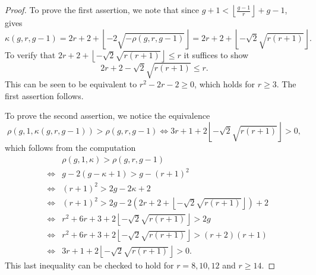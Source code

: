 \documentclass[11pt]{amsart}
\newcommand{\floor}[1]{\left\lfloor #1 \right\rfloor}
\newtheorem{lemma}[theorem]{Lemma}
\theoremstyle{definition}
\theoremstyle{definition}
\begin{document}
\begin{proof}
	To prove the first assertion, we note that since $g+1 < \floor{\frac{g-1}{r}}+g-1$, \cite[Proposition~2.5]{AHL} gives
	 \[\kappa(g,r,g-1)=2r+2+\floor{-2\sqrt{-\rho(g,r,g-1)}}=2r+2 +\floor{-\sqrt{2}\sqrt{r(r+1)}}.\] 
	To verify that $2r+2 +\floor{-\sqrt{2}\sqrt{r(r+1)}}\leq r$ it suffices to show \[2r+2-\sqrt{2}\sqrt{r(r+1)}\leq r.\] 
	This can be seen to be equivalent to $r^2-2r-2\geq 0$, which holds for $r\geq 3$. 
	The first assertion follows.
	
	To prove the second assertion, we notice the equivalence
	 \[\rho(g,1,\kappa(g,r,g-1))>\rho(g,r,g-1) \iff 3r+1+2\floor{-\sqrt{2}\sqrt{r(r+1)}}>0,\] which follows from the computation 
	 \begin{eqnarray*}
	 & &\rho(g,1,\kappa) > \rho(g,r,g-1)\\
	 &\iff & g-2(g-\kappa+1) > g-(r+1)^2 \\
	 &\iff & (r+1)^2 > 2g-2\kappa +2 \\
	 &\iff & (r+1)^2 > 2g-2\left(2r+2+\floor{-\sqrt{2}\sqrt{r(r+1)}}\right) +2 \\
	 &\iff & r^2+6r+3+2\floor{-\sqrt{2}\sqrt{r(r+1)}} >2g\\
	 &\iff & r^2+6r+3+2\floor{-\sqrt{2}\sqrt{r(r+1)}} >(r+2)(r+1) \\
	 &\iff & 3r+1+2\floor{-\sqrt{2}\sqrt{r(r+1)}}>0  .
	 \end{eqnarray*} 
	This last inequality can be checked to hold for $r=8,10,12$ and $r\geq 14$.
\end{proof}
\end{document}

